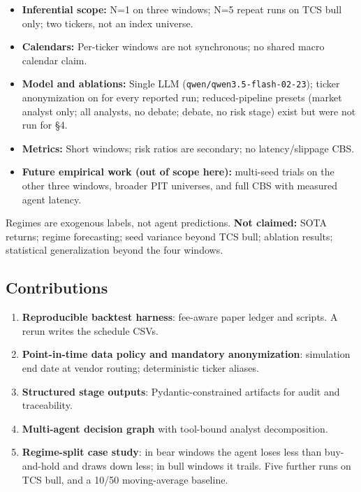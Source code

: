 \documentclass{article}
\providecommand{\tightlist}{%
  \setlength{\itemsep}{0pt}\setlength{\parskip}{0pt}}
\begin{document}
\begin{itemize}
\tightlist
\item
  \textbf{Inferential scope:} N=1 on three windows; N=5 repeat runs on TCS bull
  only; two tickers, not an index universe.
\item
  \textbf{Calendars:} Per-ticker windows are not synchronous; no shared
  macro calendar claim.
\item
  \textbf{Model and ablations:} Single LLM
  (\texttt{qwen/qwen3.5-flash-02-23}); ticker anonymization on for every
  reported run; reduced-pipeline presets (market analyst only; all analysts, no
  debate; debate, no risk stage) exist but were not run for §4.
\item
  \textbf{Metrics:} Short windows; risk ratios are secondary; no
  latency/slippage CBS.
\item
  \textbf{Future empirical work (out of scope here):} multi-seed trials
  on the other three windows, broader PIT universes, and full CBS with
  measured agent latency.
\end{itemize}

Regimes are exogenous labels, not agent predictions.
\textbf{Not claimed:} SOTA returns; regime forecasting; seed variance
beyond TCS bull; ablation results; statistical generalization beyond
the four windows.

\subsection{Contributions}\label{contributions}

\begin{enumerate}
\def\labelenumi{\arabic{enumi}.}
\tightlist
\item
  \textbf{Reproducible backtest harness}:
  fee-aware paper ledger and scripts. A rerun writes the schedule CSVs.
\item
  \textbf{Point-in-time data policy and mandatory anonymization}:
  simulation end date at vendor routing; deterministic ticker aliases.
\item
  \textbf{Structured stage outputs}: Pydantic-constrained artifacts
  for audit and traceability.
\item
  \textbf{Multi-agent decision graph} with tool-bound analyst
  decomposition.
\item
  \textbf{Regime-split case study}: in bear windows the agent loses
  less than buy-and-hold and draws down less; in bull windows it trails.
  Five further runs on TCS bull, and a 10/50 moving-average baseline.
\end{enumerate}
\end{document}

